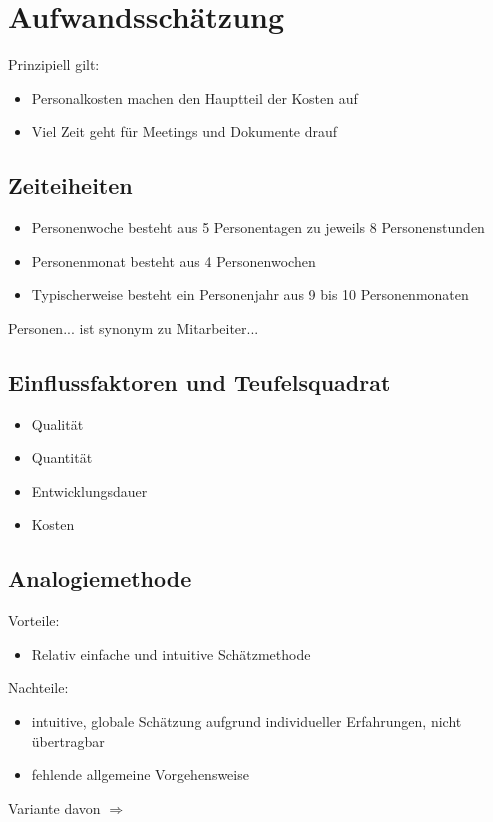 \section{Aufwandsschätzung}
Prinzipiell gilt:
\begin{itemize}
    \item Personalkosten machen den Hauptteil der Kosten auf
    \item Viel Zeit geht für Meetings und Dokumente drauf
\end{itemize}

\subsection{Zeiteiheiten}
\begin{itemize}
    \item Personenwoche besteht aus 5 Personentagen zu jeweils 8 Personenstunden
    \item Personenmonat besteht aus 4 Personenwochen
    \item Typischerweise besteht ein Personenjahr aus 9 bis 10 Personenmonaten
\end{itemize}

Personen... ist synonym zu Mitarbeiter...

\subsection{Einflussfaktoren und Teufelsquadrat}
\begin{itemize}
    \item Qualität
    \item Quantität
    \item Entwicklungsdauer
    \item Kosten
\end{itemize}


\subsection{Analogiemethode}
Vorteile:
\begin{itemize}
    \item Relativ einfache und intuitive Schätzmethode
\end{itemize}
Nachteile:
\begin{itemize}
    \item intuitive, globale Schätzung aufgrund individueller Erfahrungen, nicht übertragbar
    \item fehlende allgemeine Vorgehensweise
\end{itemize}
Variante davon $\Rightarrow$ 

